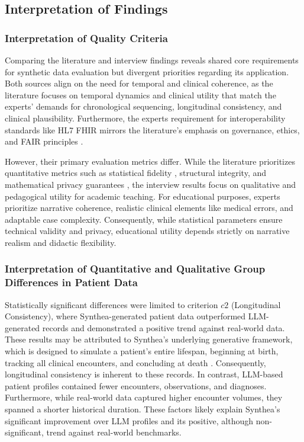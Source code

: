\subsection*{Interpretation of Findings}
\subsubsection{Interpretation of Quality Criteria}
Comparing the literature and interview findings reveals shared core requirements for synthetic data evaluation but divergent priorities regarding its application. Both sources align on the need for temporal and clinical coherence, as the literature focuses on temporal dynamics and clinical utility \citep{josling_novel_2026, theodorou_synthesize_2023, jung_clinical_2025} that match the experts' demands for chronological sequencing, longitudinal consistency, and clinical plausibility. Furthermore, the experts requirement for interoperability standards like HL7 FHIR mirrors the literature's emphasis on governance, ethics, and FAIR principles \citep{tsao_health_2023}. 

However, their primary evaluation metrics differ. While the literature prioritizes quantitative metrics such as statistical fidelity \citep{chen_generating_2025, theodorou_synthesize_2023}, structural integrity\citep{josling_novel_2026}, and mathematical privacy guarantees \citep{tsao_health_2023, hahn_contribution_2022, chen_generating_2025}, the interview results focus on qualitative and pedagogical utility for academic teaching. For educational purposes, experts prioritize narrative coherence, realistic clinical elements like medical errors, and adaptable case complexity. Consequently, while statistical parameters ensure technical validity and privacy, educational utility depends strictly on narrative realism and didactic flexibility.

\subsubsection{Interpretation of Quantitative and Qualitative Group Differences in Patient Data}
Statistically significant differences were limited to criterion $c2$ (Longitudinal Consistency), where Synthea-generated patient data outperformed LLM-generated records and demonstrated a positive trend against real-world data. These results may be attributed to Synthea's underlying generative framework, which is designed to simulate a patient's entire lifespan, beginning at birth, tracking all clinical encounters, and concluding at death \citep{synthea}. Consequently, longitudinal consistency is inherent to these records. In contrast, LLM-based patient profiles contained fewer encounters, observations, and diagnoses. Furthermore, while real-world data captured higher encounter volumes, they spanned a shorter historical duration. These factors likely explain Synthea’s significant improvement over LLM profiles and its positive, although non-significant, trend against real-world benchmarks.

